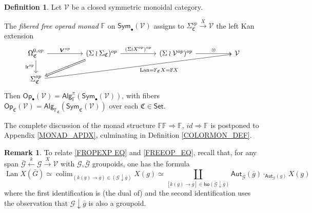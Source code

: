 \documentclass[a4paper,10pt
,draft
]{article}%
\numberwithin{equation}{section}
\numberwithin{figure}{section}
\theoremstyle{definition} %
\newtheorem{definition}[equation]{Definition}%
\newtheorem{remark}[equation]{Remark}%
\newcommand{\Sym}{\ensuremath{\mathsf{Sym}}}%
\newcommand{\Set}{\ensuremath{\mathsf{Set}}}
\newcommand{\Op}{\mathsf{Op}}%
\newcommand{\Alg}{\mathsf{Alg}}
\DeclareMathOperator{\colim}{colim}%
\DeclareMathOperator{\Lan}{Lan}%
\newcommand{\V}{\ensuremath{\mathcal V}}
\newcommand{\1}{\ensuremath{\mathbbm 1}}%
\begin{document}
\begin{definition}\label{FREEOP DEF}
	Let $\mathcal{V}$ be a closed symmetric monoidal category.
	
	The \textit{fibered free operad monad} $\mathbb{F}$ on $\mathsf{Sym}_\bullet(\mathcal{V})$ 
	assigns to 
	$\Sigma_{\mathfrak{C}}^{op} \xrightarrow{X} \mathcal{V}$
	the left Kan extension
	\begin{equation}\label{FREEOP_EQ}
                \begin{tikzcd}[column sep = 50pt]
                        \Omega^{0,op}_{\mathfrak{C}}
                        \arrow[d, "\mathsf{lr}^{op}"']
                        \arrow[r, "\boldsymbol{V}^{op}"]
                        &
                        (\Sigma \wr \Sigma_{\mathfrak{C}})^{op} \arrow[r, "(\Sigma \wr X^{op})^{op}"]
                        \arrow[dl, Rightarrow]
                        &
                        (\Sigma \wr \V^{op})^{op} \arrow[r, "\otimes"]
                        &
                        \V
                        \\
                        \Sigma^{op}_{\mathfrak{C}}
                        \arrow[urrr, "\Lan = \mathbb F_{\mathfrak{C}} X = \mathbb F X"']
                \end{tikzcd}
        \end{equation}
        Then $\Op_\bullet(\V) = \Alg^\pi_{\mathbb F}(\Sym_\bullet(\V))$,
        with fibers $\Op_{\mathfrak C}(\V) = \Alg_{\mathbb F_{\mathfrak C}}(\Sym_{\mathfrak C}(\V))$ over each $\mathfrak C \in \Set$. %
\end{definition}
The complete discussion of the monad structure
$\mathbb{F}\mathbb{F} \Rightarrow \mathbb{F}$,
$id \Rightarrow \mathbb{F}$ is postponed to Appendix \ref{MONAD_APDX},
culminating in Definition \ref{COLORMON_DEF}.


\begin{remark}\label{CONVER REM}
	To relate \eqref{FROPEXP EQ} and \eqref{FREEOP_EQ}, recall that, 
	for any span 
	$\bar{\mathcal{G}} \overset{k}{\leftarrow} \mathcal{G} \xrightarrow{X} \mathcal{V}$
	with $\mathcal{G},\bar{\mathcal{G}}$ groupoids,
	one has the formula
	\[\Lan X (\bar{G}) \simeq 
	\colim_{(k(g) \to \bar{g})\in (\mathcal{G} \downarrow \bar{g})} X(g) \simeq
	\coprod_{[k(g) \to \bar{g}] 
		\in \mathsf{Iso}(\mathcal{G} \downarrow \bar{g})}
	\mathsf{Aut}_{\bar{\mathcal{G}}}(\bar{g})
	\cdot_{\mathsf{Aut}_{\mathcal{G}}(g)}
	X(g)
	\]
	where the first identification is
	(the dual of) \cite[Thm. 1.3.5]{Ri14}
	and the second identification uses the observation that
	$\mathcal{G} \downarrow \bar{g}$ is also a groupoid.
\end{remark}
\end{document}
